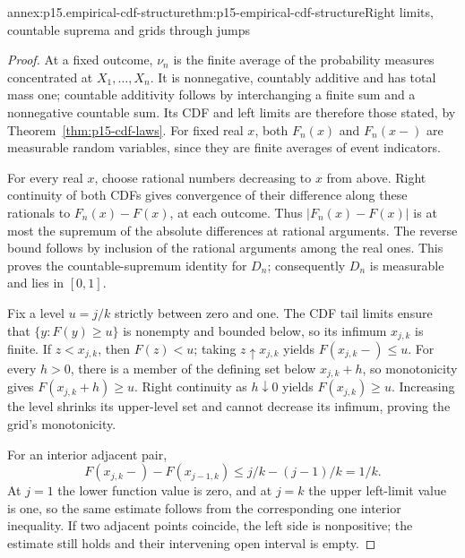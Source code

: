 \begin{annexitem}{annex:p15.empirical-cdf-structure}{thm:p15-empirical-cdf-structure}{Right limits, countable suprema and grids through jumps}
\begin{proof}
At a fixed outcome, \(\nu_n\) is the finite average of the probability
measures concentrated at \(X_1,\ldots,X_n\). It is nonnegative,
countably additive and has total mass one; countable additivity follows
by interchanging a finite sum and a nonnegative countable sum.
Its CDF and left limits are therefore those stated, by
Theorem~\ref{thm:p15-cdf-laws}. For fixed real \(x\), both \(F_n(x)\)
and \(F_n(x-)\) are measurable random variables, since they are
finite averages of event indicators.

For every real \(x\), choose rational numbers decreasing to \(x\)
from above. Right continuity of both CDFs gives convergence of their
difference along these rationals to \(F_n(x)-F(x)\), at each
outcome. Thus \(|F_n(x)-F(x)|\) is at most the supremum of the
absolute differences at rational arguments. The reverse bound follows
by inclusion of the rational arguments among the real ones. This proves
the countable-supremum identity for \(D_n\); consequently \(D_n\)
is measurable and lies in \([0,1]\).

Fix a level \(u=j/k\) strictly between zero and one. The CDF tail
limits ensure that \(\{y:F(y)\geq u\}\) is nonempty and bounded
below, so its infimum \(x_{j,k}\) is finite. If \(z<x_{j,k}\),
then \(F(z)<u\); taking \(z\uparrow x_{j,k}\) yields
\(F(x_{j,k}-)\leq u\). For every \(h>0\), there is a member
of the defining set below \(x_{j,k}+h\), so monotonicity gives
\(F(x_{j,k}+h)\geq u\). Right continuity as \(h\downarrow0\)
yields \(F(x_{j,k})\geq u\). Increasing the level shrinks its
upper-level set and cannot decrease its infimum, proving the grid's
monotonicity.

For an interior adjacent pair,
\[
 F(x_{j,k}-)-F(x_{j-1,k})
           \leq j/k-(j-1)/k=1/k.
\]
At \(j=1\) the lower function value is zero, and at \(j=k\)
the upper left-limit value is one, so the same estimate follows
from the corresponding one interior inequality. If two adjacent
points coincide, the left side is nonpositive; the estimate still
holds and their intervening open interval is empty.
\end{proof}
\end{annexitem}

